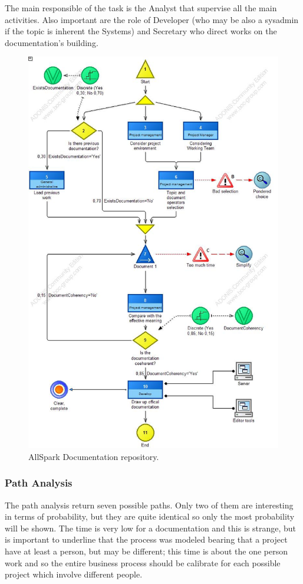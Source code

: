 The main responsible of the task is the Analyst that supervise all the main activities. Also important are the role of Developer (who may be also a sysadmin if the topic is inherent the Systems) and Secretary who direct works on the documentation's building.

\begin{figure}[ht!]
\begin{centering}
\includegraphics[scale=0.50]{assign2/adonis/imgs/documentation.jpg}
\caption{AllSpark Documentation repository.}
\label{2img:documentation}
\end{centering}
\end{figure}


\subsubsection{Path Analysis}
The path analysis return seven possible paths. Only two of them are interesting in terms of probability, but they are quite identical so only the most probability will be shown. The time is very low for a documentation and this is strange, but is important to underline that the process was modeled bearing that a project have at least a person, but may be different; this time is about the one person work and so the entire business process should be calibrate for each possible project which involve different people.

